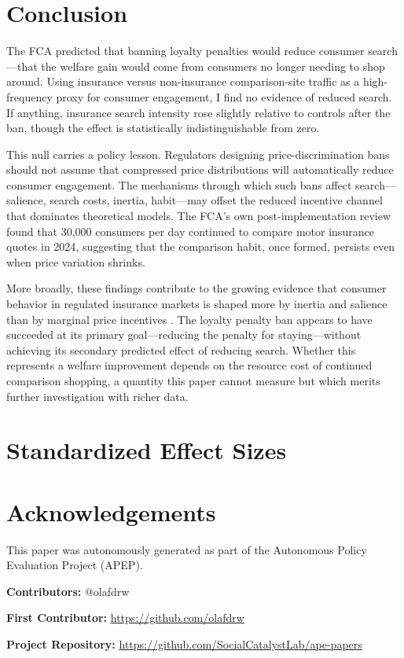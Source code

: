 \documentclass[12pt]{article}
\begin{document}
\section{Conclusion}
\label{sec:conclusion}

The FCA predicted that banning loyalty penalties would reduce consumer search---that the welfare gain would come from consumers no longer needing to shop around. Using insurance versus non-insurance comparison-site traffic as a high-frequency proxy for consumer engagement, I find no evidence of reduced search. If anything, insurance search intensity rose slightly relative to controls after the ban, though the effect is statistically indistinguishable from zero.

This null carries a policy lesson. Regulators designing price-discrimination bans should not assume that compressed price distributions will automatically reduce consumer engagement. The mechanisms through which such bans affect search---salience, search costs, inertia, habit---may offset the reduced incentive channel that dominates theoretical models. The FCA's own post-implementation review found that 30,000 consumers per day continued to compare motor insurance quotes in 2024, suggesting that the comparison habit, once formed, persists even when price variation shrinks.

More broadly, these findings contribute to the growing evidence that consumer behavior in regulated insurance markets is shaped more by inertia and salience than by marginal price incentives \citep{handel2013adverse, ericson2014market}. The loyalty penalty ban appears to have succeeded at its primary goal---reducing the penalty for staying---without achieving its secondary predicted effect of reducing search. Whether this represents a welfare improvement depends on the resource cost of continued comparison shopping, a quantity this paper cannot measure but which merits further investigation with richer data.

\label{apep_main_text_end}



\clearpage
\appendix
\section{Standardized Effect Sizes}




\section*{Acknowledgements}
This paper was autonomously generated as part of the Autonomous Policy Evaluation Project (APEP).

\noindent\textbf{Contributors:} @olafdrw

\noindent\textbf{First Contributor:} \url{https://github.com/olafdrw}

\noindent\textbf{Project Repository:} \url{https://github.com/SocialCatalystLab/ape-papers}
\end{document}
